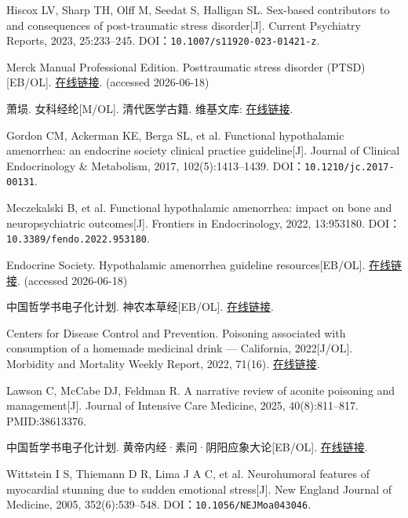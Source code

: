 \begin{enumerate}[label={[Q\arabic*]},leftmargin=*]
  \item Hiscox LV, Sharp TH, Olff M, Seedat S, Halligan SL. Sex-based contributors to and consequences of post-traumatic stress disorder[J]. Current Psychiatry Reports, 2023, 25:233–245. DOI：\nolinkurl{10.1007/s11920-023-01421-z}.
  \item Merck Manual Professional Edition. Posttraumatic stress disorder (PTSD)[EB/OL]. \href{https://www.merckmanuals.com/professional/psychiatric-disorders/anxiety-and-trauma-and-stressor-related-disorders/posttraumatic-stress-disorder-ptsd}{在线链接}. (accessed 2026-06-18)
  \item 萧埙. 女科经纶[M/OL]. 清代医学古籍. 维基文库: \href{https://zh.wikisource.org/zh-hans/女科經綸}{在线链接}.
  \item Gordon CM, Ackerman KE, Berga SL, et al. Functional hypothalamic amenorrhea: an endocrine society clinical practice guideline[J]. Journal of Clinical Endocrinology \& Metabolism, 2017, 102(5):1413–1439. DOI：\nolinkurl{10.1210/jc.2017-00131}.
  \item Meczekalski B, et al. Functional hypothalamic amenorrhea: impact on bone and neuropsychiatric outcomes[J]. Frontiers in Endocrinology, 2022, 13:953180. DOI：\nolinkurl{10.3389/fendo.2022.953180}.
  \item Endocrine Society. Hypothalamic amenorrhea guideline resources[EB/OL]. \href{https://www.endocrine.org/clinical-practice-guidelines/hypothalamic-amenorrhea}{在线链接}. (accessed 2026-06-18)
  \item 中国哲学书电子化计划. 神农本草经[EB/OL]. \href{https://jicheng.tw/tcm/book/神農本草經_2/index.html}{在线链接}.
  \item Centers for Disease Control and Prevention. Poisoning associated with consumption of a homemade medicinal drink — California, 2022[J/OL]. Morbidity and Mortality Weekly Report, 2022, 71(16). \href{https://www.cdc.gov/mmwr/volumes/71/wr/mm7116a2.htm}{在线链接}.
  \item Lawson C, McCabe DJ, Feldman R. A narrative review of aconite poisoning and management[J]. Journal of Intensive Care Medicine, 2025, 40(8):811–817. PMID:38613376.
  \item 中国哲学书电子化计划. 黄帝内经·素问·阴阳应象大论[EB/OL]. \href{https://ctext.org/huangdi-neijing/yin-yang-ying-xiang-da-lun/zhs}{在线链接}.
  \item Wittstein I S, Thiemann D R, Lima J A C, et al. Neurohumoral features of myocardial stunning due to sudden emotional stress[J]. New England Journal of Medicine, 2005, 352(6):539–548. DOI：\nolinkurl{10.1056/NEJMoa043046}.

\end{enumerate}
